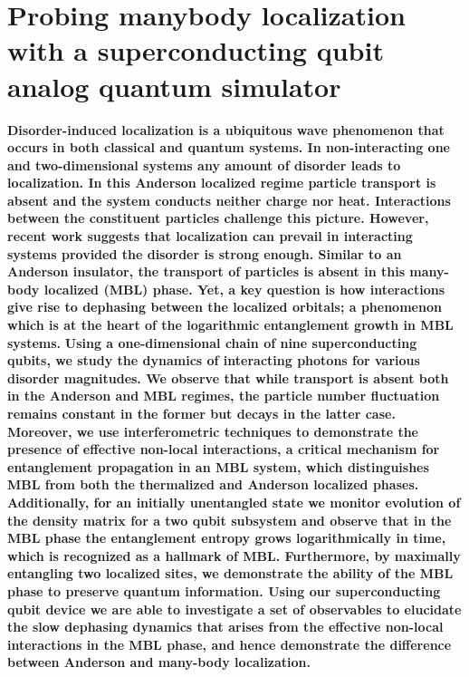 \chapter{Probing manybody localization with a superconducting qubit analog quantum simulator}

\textbf{
    Disorder-induced localization is a ubiquitous wave phenomenon that occurs in both classical and quantum systems.
    In non-interacting one and two-dimensional systems any amount of disorder leads to localization.\autocite{Anderson1958, Abrahams1979}
    In this Anderson localized regime particle transport is absent and the system conducts neither charge nor heat.
    Interactions between the constituent particles challenge this picture. However, recent work suggests that localization can prevail in interacting systems provided the disorder is strong enough.\autocite{Nandkishore2015, Altman2015,  Basko2006, Gornyi2005}
    Similar to an Anderson insulator, the transport of particles is absent in this many-body localized (MBL) phase.
    Yet, a key question is how interactions give rise to dephasing between the localized orbitals; a phenomenon which is at the heart of the logarithmic entanglement growth in MBL systems.\autocite{Bardarson2012, Serbyn2013, Huse2014}
}
\textbf{
    Using a one-dimensional chain of nine superconducting qubits\autocite{Neill2018},
    we study the dynamics of interacting photons for various disorder magnitudes. We observe that while transport is absent both in the Anderson and MBL regimes,
    the particle number fluctuation remains constant in the former but decays in the latter case. Moreover, we use interferometric techniques to demonstrate the presence of effective non-local interactions, a critical mechanism for entanglement propagation in an MBL system, which distinguishes MBL from both the thermalized and Anderson localized phases.
    Additionally, for an initially unentangled state we monitor evolution of the density matrix for a two qubit subsystem
    and observe that in the MBL phase the entanglement entropy grows logarithmically in time, which is recognized as a hallmark of MBL.
    Furthermore, by maximally entangling two localized sites, we demonstrate the ability of the MBL phase to preserve quantum information.
    Using our superconducting qubit device we are able to investigate a set of observables to elucidate the slow dephasing dynamics that arises from the effective non-local interactions in the MBL phase, and hence
    demonstrate the difference between Anderson and many-body localization.}


